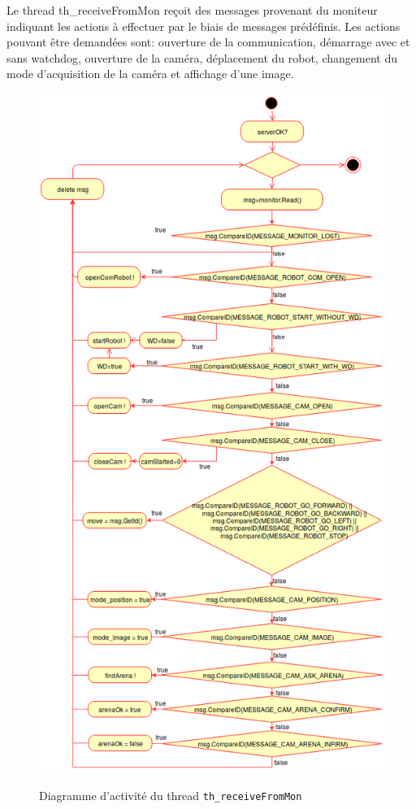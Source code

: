 \documentclass[11pt, a4paper]{paper}
\begin{document}
{ Le thread th\_receiveFromMon reçoit des messages provenant du moniteur indiquant les actions à effectuer par le biais de messages prédéfinis. Les actions pouvant être demandées sont: ouverture de la communication, démarrage avec et sans watchdog, ouverture de la caméra, déplacement du robot, changement du mode d'acquisition de la caméra et affichage d'une image. }

\begin{figure}[htp]
\label{fig:act_communiquer}
\begin{center}
{\includegraphics[scale=.4]{./dossier_conception/th_receiveFromMon.png}}
{\caption{Diagramme d'activité du thread {\tt th\_receiveFromMon}}}
\end{center}
\end{figure}
\FloatBarrier
\end{document}
